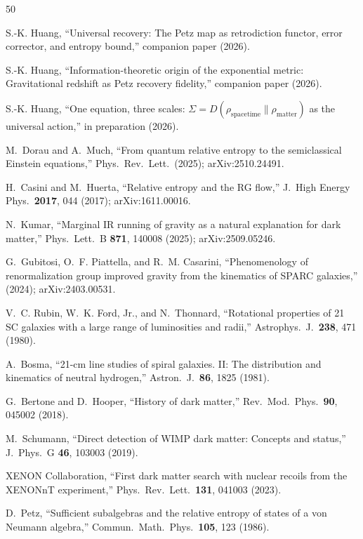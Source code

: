 \documentclass[prl,twocolumn,superscriptaddress,longbibliography,floatfix]{revtex4-2}
\begin{document}
\begin{thebibliography}{50}

S.-K. Huang,
``Universal recovery: The Petz map as retrodiction functor,
error corrector, and entropy bound,''
companion paper (2026).

S.-K. Huang,
``Information-theoretic origin of the exponential metric:
Gravitational redshift as Petz recovery fidelity,''
companion paper (2026).

S.-K. Huang,
``One equation, three scales: $\Sigma = D(\rho_{\mathrm{spacetime}}
\| \rho_{\mathrm{matter}})$ as the universal action,''
in preparation (2026).

M.~Dorau and A.~Much,
``From quantum relative entropy to the semiclassical Einstein
equations,''
Phys.\ Rev.\ Lett.\ (2025); arXiv:2510.24491.

H.~Casini and M.~Huerta,
``Relative entropy and the RG flow,''
J.\ High Energy Phys.\ \textbf{2017}, 044 (2017);
arXiv:1611.00016.

N.~Kumar,
``Marginal IR running of gravity as a natural explanation for
dark matter,''
Phys.\ Lett.\ B \textbf{871}, 140008 (2025);
arXiv:2509.05246.

G.~Gubitosi, O.~F. Piattella, and R.~M. Casarini,
``Phenomenology of renormalization group improved gravity from
the kinematics of SPARC galaxies,''
(2024); arXiv:2403.00531.

V.~C. Rubin, W.~K. Ford, Jr., and N.~Thonnard,
``Rotational properties of 21 SC galaxies with a large range
of luminosities and radii,''
Astrophys.\ J.\ \textbf{238}, 471 (1980).

A.~Bosma,
``21-cm line studies of spiral galaxies. II: The distribution
and kinematics of neutral hydrogen,''
Astron.\ J.\ \textbf{86}, 1825 (1981).

G.~Bertone and D.~Hooper,
``History of dark matter,''
Rev.\ Mod.\ Phys.\ \textbf{90}, 045002 (2018).

M.~Schumann,
``Direct detection of WIMP dark matter: Concepts and status,''
J.\ Phys.\ G \textbf{46}, 103003 (2019).

XENON Collaboration,
``First dark matter search with nuclear recoils from the
XENONnT experiment,''
Phys.\ Rev.\ Lett.\ \textbf{131}, 041003 (2023).

D.~Petz,
``Sufficient subalgebras and the relative entropy of states of a
von Neumann algebra,''
Commun.\ Math.\ Phys.\ \textbf{105}, 123 (1986).


\end{thebibliography}
\end{document}

